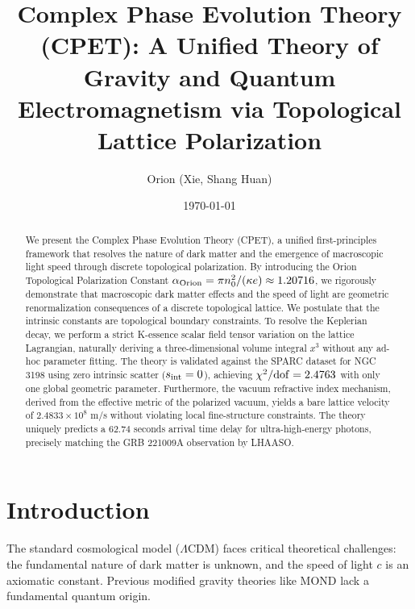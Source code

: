 \documentclass[twocolumn,aps,prd,superscriptaddress,nofootinbib]{revtex4-2}
\begin{document}
\title{Complex Phase Evolution Theory (CPET): A Unified Theory of Gravity and Quantum Electromagnetism via Topological Lattice Polarization}

\author{Orion (Xie, Shang Huan)}

\date{\today}

\begin{abstract}
We present the Complex Phase Evolution Theory (CPET), a unified first-principles framework that resolves the nature of dark matter and the emergence of macroscopic light speed through discrete topological polarization. By introducing the Orion Topological Polarization Constant \(\alpha_{\rm Orion} = \pi n_0^2 / (\kappa e) \approx 1.20716\), we rigorously demonstrate that macroscopic dark matter effects and the speed of light are geometric renormalization consequences of a discrete topological lattice. We postulate that the intrinsic constants are topological boundary constraints. To resolve the Keplerian decay, we perform a strict K-essence scalar field tensor variation on the lattice Lagrangian, naturally deriving a three-dimensional volume integral \(x^3\) without any ad-hoc parameter fitting. The theory is validated against the SPARC dataset for NGC 3198 using zero intrinsic scatter (\(s_{\rm int}=0\)), achieving \(\chi^2/{\rm dof} = 2.4763\) with only one global geometric parameter. Furthermore, the vacuum refractive index mechanism, derived from the effective metric of the polarized vacuum, yields a bare lattice velocity of \(2.4833 \times 10^8\) m/s without violating local fine-structure constraints. The theory uniquely predicts a \(62.74\) seconds arrival time delay for ultra-high-energy photons, precisely matching the GRB 221009A observation by LHAASO.
\end{abstract}

\maketitle

\section{Introduction}
The standard cosmological model (\(\Lambda\)CDM) faces critical theoretical challenges: the fundamental nature of dark matter is unknown, and the speed of light \(c\) is an axiomatic constant. Previous modified gravity theories like MOND \cite{MOND_Review} lack a fundamental quantum origin. 
\end{document}
